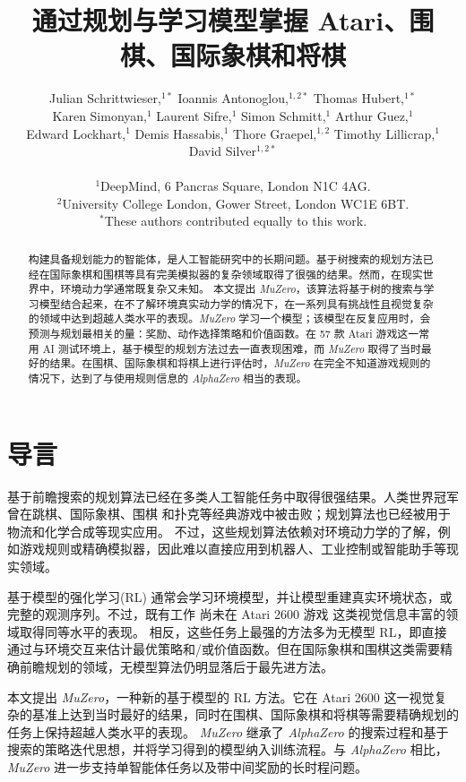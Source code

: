 \documentclass{article}
\title{通过规划与学习模型掌握 Atari、围棋、国际象棋和将棋}
\author{
Julian Schrittwieser,$^{1\ast}$ Ioannis Antonoglou,$^{1,2\ast}$ Thomas Hubert,$^{1\ast}$ \\
Karen Simonyan,$^{1}$ Laurent Sifre,$^{1}$ Simon Schmitt,$^{1}$ Arthur Guez,$^{1}$ \\
Edward Lockhart,$^{1}$ Demis Hassabis,$^{1}$ Thore Graepel,$^{1,2}$ Timothy Lillicrap,$^{1}$ \\
David Silver$^{1,2\ast}$
\\
\\
\normalsize{$^{1}$DeepMind, 6 Pancras Square, London N1C 4AG.}
\\
\normalsize{$^{2}$University College London, Gower Street, London WC1E 6BT.}
\\
\normalsize{$^\ast$These authors contributed equally to this work.}
}
\date{}
\newcommand{\muzero}{\emph{MuZero}}
\newcommand{\alphazero}{\emph{AlphaZero}}
\begin{document}
\maketitle

\begin{abstract}
\normalsize
构建具备规划能力的智能体，是人工智能研究中的长期问题。基于树搜索的规划方法已经在国际象棋和围棋等具有完美模拟器的复杂领域取得了很强的结果。然而，在现实世界中，环境动力学通常既复杂又未知。
%
本文提出 \muzero{}，该算法将基于树的搜索与学习模型结合起来，在不了解环境真实动力学的情况下，在一系列具有挑战性且视觉复杂的领域中达到超越人类水平的表现。\muzero{} 学习一个模型；该模型在反复应用时，会预测与规划最相关的量：奖励、动作选择策略和价值函数。在 57 款 Atari 游戏这一常用 AI 测试环境上，基于模型的规划方法过去一直表现困难，而 \muzero{} 取得了当时最好的结果。在围棋、国际象棋和将棋上进行评估时，\muzero{} 在完全不知道游戏规则的情况下，达到了与使用规则信息的 \alphazero{} 相当的表现。
\end{abstract}

\section{导言}

基于前瞻搜索的规划算法已经在多类人工智能任务中取得很强结果。人类世界冠军曾在跳棋\cite{schaeffer:chinook}、国际象棋\cite{campbell:deep-blue}、围棋\cite{Silver16AG} 和扑克\cite{brown2018superhuman, deepstack}等经典游戏中被击败；规划算法也已经被用于物流\cite{vlahavas2013planning}和化学合成\cite{alphachem}等现实应用。
不过，这些规划算法依赖对环境动力学的了解，例如游戏规则或精确模拟器，因此难以直接应用到机器人、工业控制或智能助手等现实领域。
%

基于模型的强化学习(RL)\cite{sutton:book} 通常会学习环境模型，并让模型重建真实环境状态\cite{pilco:deisenroth,heess:stochastic_value_gradients,levine:learning_guided_policy}，或完整的观测序列\cite{hafner:planet, kaiser:simple}。不过，既有工作\cite{state_space_models, hafner:planet, kaiser:simple} 尚未在 Atari 2600 游戏\cite{ALE} 这类视觉信息丰富的领域取得同等水平的表现。
相反，这些任务上最强的方法多为无模型 RL\cite{impala, r2d2, apex}，即直接通过与环境交互来估计最优策略和/或价值函数。但在国际象棋和围棋这类需要精确前瞻规划的领域，无模型算法仍明显落后于最先进方法。

本文提出 \muzero{}，一种新的基于模型的 RL 方法。它在 Atari 2600 这一视觉复杂的基准上达到当时最好的结果，同时在围棋、国际象棋和将棋等需要精确规划的任务上保持超越人类水平的表现。
\muzero{} 继承了 \alphazero{} \cite{Silver18AZ} 的搜索过程和基于搜索的策略迭代思想，并将学习得到的模型纳入训练流程。与 \alphazero{} 相比，\muzero{} 进一步支持单智能体任务以及带中间奖励的长时程问题。
%
\end{document}
